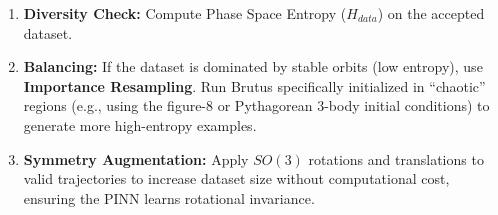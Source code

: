 \begin{enumerate}
    \item \textbf{Diversity Check:} Compute Phase Space Entropy ($H_{data}$) on the accepted dataset.
    \item \textbf{Balancing:} If the dataset is dominated by stable orbits (low entropy), use \textbf{Importance Resampling}. Run Brutus specifically initialized in ``chaotic'' regions (e.g., using the figure-8 or Pythagorean 3-body initial conditions) to generate more high-entropy examples.
    \item \textbf{Symmetry Augmentation:} Apply $SO(3)$ rotations and translations to valid trajectories to increase dataset size without computational cost, ensuring the PINN learns rotational invariance.
\end{enumerate}
